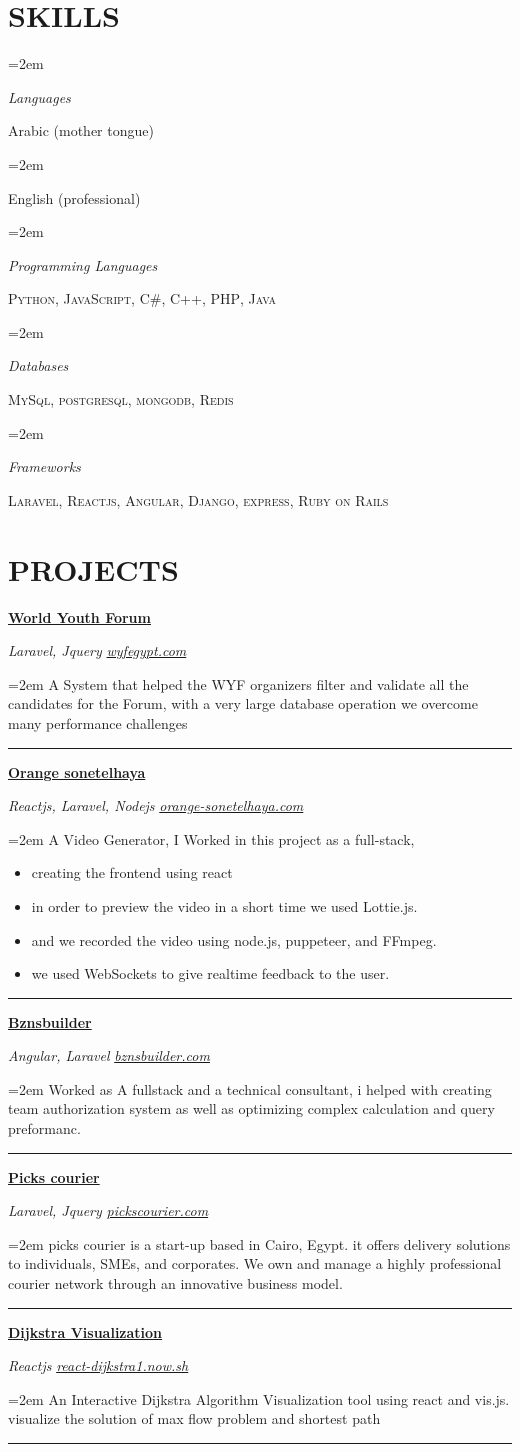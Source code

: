 \documentclass[paper=a4,fontsize=11pt]{scrartcl} %
\newlength{\spacebox}
\newcommand{\sepspace}{\vspace*{1em}}		%
\newcommand{\NewPart}[1]{\section*{\uppercase{#1}}}
\newcommand{\PersonalEntry}[2]{
		\noindent\hangindent=1em\hangafter=0 %
		\parbox{\spacebox}{        %
		\textit{#1}}		       %
		\hspace{1.5em} #2 \par}    %
\newcommand{\SkillsEntry}[2]{      %
		\noindent\hangindent=2em\hangafter=0 %
		\parbox{\spacebox}{        %
		\textit{#1}}			   %
		\hspace{1.5em} #2 \par}    %
\newcommand{\ProjectEntry}[4]{
		\noindent \textbf{\href{https://#2}{#1}} \hfill \par
		 \noindent  \textit{#4}  \hfill    
        \small{\itshape\href{https://#2}{#2}} \par  %
		\noindent\hangindent=2em\hangafter=0 \small #3 %
		\normalsize 
		\sepspace
		\par\noindent\textcolor{gray}{\rule{\textwidth}{0.2pt}}
		}
\begin{document}
\NewPart{Skills}{
\SkillsEntry{Languages}{Arabic (mother tongue)}
\SkillsEntry{}{English (professional)}

\sepspace
\SkillsEntry{Programming Languages}{\textsc{Python}, \textsc{JavaScript},  \textsc{C\#}, \textsc{C++},  \textsc{PHP}, \textsc{Java}}
\sepspace


\SkillsEntry{Databases}{\textsc{MySql}, \textsc{postgresql}, \textsc{mongodb}, \textsc{Redis}}

\sepspace


\SkillsEntry{Frameworks}{\textsc{Laravel}, \textsc{Reactjs}, \textsc{Angular}, \textsc{Django}, \textsc{express}, \textsc{Ruby on Rails}}

}

\NewPart{projects}{
\ProjectEntry{World Youth Forum}{wyfegypt.com}{A System that helped the WYF organizers filter and validate all the candidates for the Forum, with a very large database operation we overcome many performance challenges}{Laravel, Jquery}

\ProjectEntry{Orange sonetelhaya}{orange-sonetelhaya.com}{A Video Generator, I Worked in this project as a full-stack, 
\begin{itemize}
 \item creating the frontend using react
 \item in order to preview the video in a short time we used Lottie.js.
 \item and we recorded the video using node.js, puppeteer, and FFmpeg.
 \item we used WebSockets to give realtime feedback to the user.
\end{itemize}
}{Reactjs, Laravel, Nodejs}

\ProjectEntry{Bznsbuilder}{bznsbuilder.com}{Worked as A fullstack and a technical consultant, i helped with creating team authorization system as well as optimizing complex calculation and query preformanc.}{Angular, Laravel}

\ProjectEntry{Picks courier}{pickscourier.com}{
picks courier is a start-up based in Cairo, Egypt. it offers delivery solutions to individuals, SMEs, and corporates. We own and manage a highly professional courier network through an innovative business model.}{Laravel, Jquery}


\ProjectEntry{Dijkstra Visualization}{react-dijkstra1.now.sh}{
An Interactive Dijkstra Algorithm Visualization tool using react and vis.js. visualize the solution of max flow problem and shortest path
}{Reactjs}



}
\end{document}
